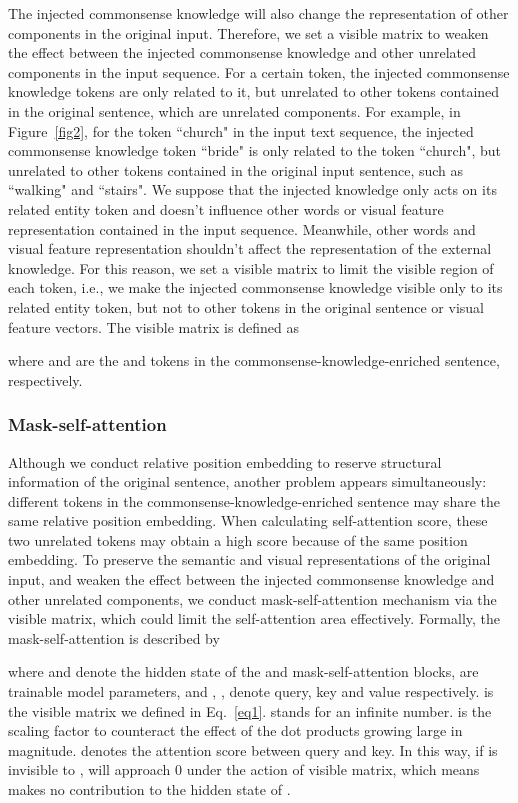 \documentclass[conference]{IEEEtran}
\begin{document}
The injected commonsense knowledge will also change the representation of other components in the original input. Therefore, we set a visible matrix to weaken the effect between the injected commonsense knowledge and other unrelated components in the input sequence. For a certain token, the injected commonsense knowledge tokens are only related to it, but unrelated to other tokens contained in the original sentence, which are unrelated components. For example, in Figure~\ref{fig2}, for the token “church" in the input text sequence, the injected commonsense knowledge token “bride" is only related to the token “church", but unrelated to other tokens contained in the original input sentence, such as “walking" and “stairs". We suppose that the injected knowledge only acts on its related entity token and doesn't influence  other words or visual feature representation contained in the input sequence. Meanwhile, other words and visual feature representation shouldn't affect the representation of the external knowledge. For this reason, we set a visible matrix to limit the visible region of each token, i.e., we make the injected commonsense knowledge visible only to its related entity token, but not to other tokens in the original sentence or visual feature vectors. The visible matrix  is defined as 

where  and  are the  and  tokens in the commonsense-knowledge-enriched sentence, respectively. \subsubsection{Mask-self-attention}


Although we conduct relative position embedding to reserve structural information of the original sentence, another problem appears simultaneously: different tokens in the commonsense-knowledge-enriched sentence may share the same relative position embedding. When calculating self-attention score, these two unrelated tokens may obtain a high score because of the same position embedding. To preserve the semantic and visual representations of the original input, and weaken the effect between the injected commonsense knowledge and other unrelated components, we conduct mask-self-attention mechanism via the visible matrix, which could limit the self-attention area effectively. Formally, the mask-self-attention is described by 







where  and  denote the hidden state of the  and  mask-self-attention blocks,  are trainable model parameters, and , ,   denote query, key and value respectively.  is the visible matrix we defined in Eq.~\ref{eq1}.  stands for an infinite number.  is the scaling factor to counteract the effect of the dot products growing large in magnitude.  denotes the attention score between query and key. In this way, if  is invisible to ,  will approach 0 under the action of visible matrix, which means  makes no contribution to the hidden state of .
\end{document}
